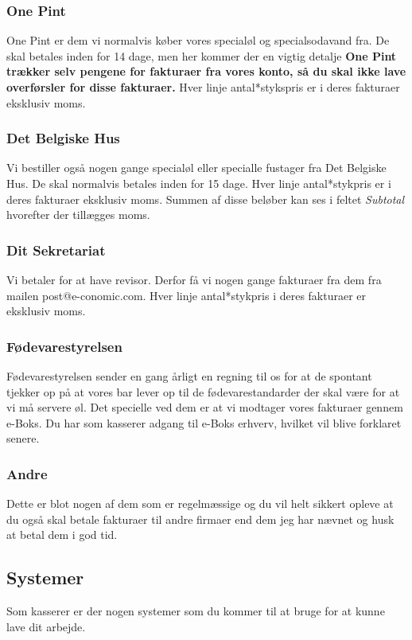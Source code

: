 \subsubsection{One Pint}
One Pint er dem vi normalvis køber vores specialøl og specialsodavand fra. De skal betales inden for 14 dage, men her kommer der en vigtig detalje \textbf{One Pint trækker selv pengene for fakturaer fra vores konto, så du skal ikke lave overførsler for disse fakturaer.} Hver linje antal*stykspris er i deres fakturaer eksklusiv moms.
\subsubsection{Det Belgiske Hus}
Vi bestiller også nogen gange specialøl eller specialle fustager fra Det Belgiske Hus. De skal normalvis betales inden for 15 dage. Hver linje antal*stykpris er i deres fakturaer eksklusiv moms. Summen af disse beløber kan ses i feltet \textit{Subtotal} hvorefter der tillægges moms.
\subsubsection{Dit Sekretariat}
Vi betaler for at have revisor. Derfor få vi nogen gange fakturaer fra dem fra mailen post@e-conomic.com. Hver linje antal*stykpris i deres fakturaer er eksklusiv moms.
\subsubsection{Fødevarestyrelsen}
Fødevarestyrelsen sender en gang årligt en regning til os for at de spontant tjekker op på at vores bar lever op til de fødevarestandarder der skal være for at vi må servere øl. Det specielle ved dem er at vi modtager vores fakturaer gennem e-Boks. Du har som kasserer adgang til e-Boks erhverv, hvilket vil blive forklaret senere.
\subsubsection{Andre}
Dette er blot nogen af dem som er regelmæssige og du vil helt sikkert opleve at du også skal betale fakturaer til andre firmaer end dem jeg har nævnet og husk at betal dem i god tid.
\subsection{Systemer}
Som kasserer er der nogen systemer som du kommer til at bruge for at kunne lave dit arbejde.
